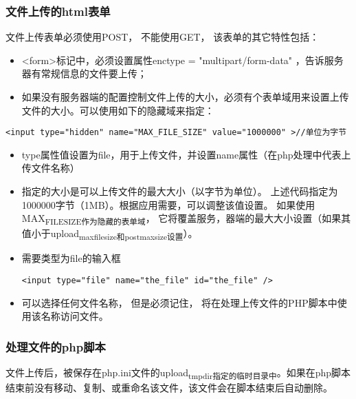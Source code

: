 \documentclass[11pt]{article}
\begin{document}
\subsubsection{文件上传的html表单}
\label{sec:org657918e}
文件上传表单必须使用POST， 不能使用GET， 该表单的其它特性包括：
\begin{itemize}
\item <form>标记中，必须设置属性enctype = "multipart/form-data" ，告诉服务器有常规信息的文件要上传；
\item 如果没有服务器端的配置控制文件上传的大小，必须有个表单域用来设置上传文件的大小。可以使用如下的隐藏域来指定：
\end{itemize}
\begin{verbatim}
<input type="hidden" name="MAX_FILE_SIZE" value="1000000" >//单位为字节
\end{verbatim}
\begin{itemize}
\item type属性值设置为file，用于上传文件，并设置name属性（在php处理中代表上传文件名称）
\item 指定的大小是可以上传文件的最大大小（以字节为单位）。 上述代码指定为1000000字节（1MB）。根据应用需要，可以调整该值设置。 如果使用MAX\textsubscript{FILE}\textsubscript{SIZE作为隐藏的表单域}， 它将覆盖服务，器端的最大大小设置（如果其值小于upload\textsubscript{max}\textsubscript{filesize和post}\textsubscript{max}\textsubscript{size设置}）。
\item 需要类型为file的输入框
\begin{verbatim}
<input type="file" name="the_file" id="the_file" />
\end{verbatim}
\item 可以选择任何文件名称， 但是必须记住， 将在处理上传文件的PHP脚本中使用该名称访问文件。
\end{itemize}
\subsubsection{处理文件的php脚本}
\label{sec:org1e79dd0}
文件上传后，被保存在php.ini文件的upload\textsubscript{tmp}\textsubscript{dir指定的临时目录中}。如果在php脚本结束前没有移动、复制、或重命名该文件，该文件会在脚本结束后自动删除。
\end{document}
